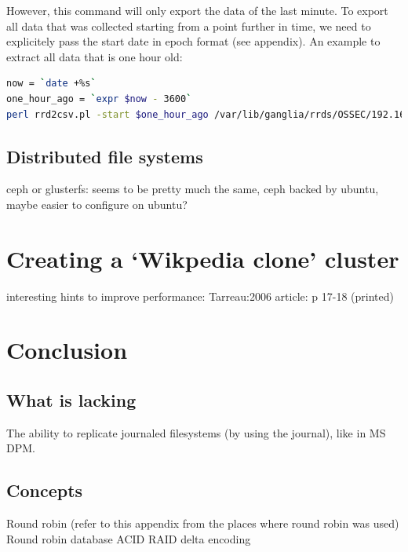 \documentclass[12pt]{report}
\begin{document}
However, this command will only export the data of the last minute. To
export all data that was collected starting from a point further in time, we need to
explicitely pass the start date in epoch format (see appendix).
An example to extract all data that is one hour old:
\begin{lstlisting}[language=bash]
now = `date +%s`
one_hour_ago = `expr $now - 3600` 
perl rrd2csv.pl -start $one_hour_ago /var/lib/ganglia/rrds/OSSEC/192.168.15.4/cpu\_user.rrd > node1_cpu_user.csv
\end{lstlisting} 



\section{Distributed file systems}

ceph or glusterfs: seems to be pretty much the same, ceph backed by
ubuntu, maybe easier to  configure on ubuntu?

\chapter{Creating a `Wikpedia clone' cluster}
interesting hints to improve performance: Tarreau:2006 article: p
17-18 (printed)

\chapter{Conclusion} %
\section{What is lacking}
The ability to replicate journaled filesystems (by using the journal),
like in MS DPM.

\begin{appendices}
\chapter{Concepts}
Round robin (refer to this appendix from the places where round robin
was used)
Round robin database
ACID
RAID
delta encoding
\end{appendices}




{}


\end{document}
